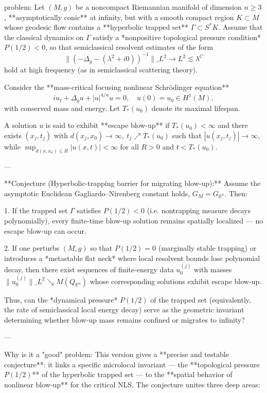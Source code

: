 problem:  
Let \((M,g)\) be a noncompact Riemannian manifold of dimension \(n\ge3\), **asymptotically conic** at infinity, but with a smooth compact region \(K\subset M\) whose geodesic flow contains a **hyperbolic trapped set** \(\Gamma\subset S^*K\).  
Assume that the classical dynamics on \(\Gamma\) satisfy a *nonpositive topological pressure condition* \(P(1/2)<0\), so that semiclassical resolvent estimates of the form
\[
\|(-\Delta_g - (\lambda^2+i0))^{-1}\|\_{L^2\to L^2}\lesssim \lambda^C
\]
hold at high frequency (as in semiclassical scattering theory).

Consider the **mass-critical focusing nonlinear Schrödinger equation**
\[
i u_t+\Delta_g u+|u|^{4/n}u=0,\quad u(0)=u_0\in H^1(M),
\]
with conserved mass and energy. Let \(T_*(u_0)\) denote its maximal lifespan.

A solution \(u\) is said to exhibit **escape blow-up** if \(T_*(u_0)<\infty\) and there exists \((x_j,t_j)\) with \(d(x_j,x_0)\to\infty,\ t_j\nearrow T_*(u_0)\) such that \(|u(x_j,t_j)|\to\infty\), while \(\sup_{d(x,x_0)\le R}|u(x,t)|<\infty\) for all \(R>0\) and \(t<T_*(u_0)\).

---

**Conjecture (Hyperbolic-trapping barrier for migrating blow-up):**  
Assume the asymptotic Euclidean Gagliardo–Nirenberg constant holds, \(G_M=G_{\mathbb{R}^n}\).  
Then:

1. If the trapped set \(\Gamma\) satisfies \(P(1/2)<0\) (i.e. nontrapping measure decays polynomially), every finite-time blow-up solution remains spatially localized — no escape blow-up can occur.

2. If one perturbs \((M,g)\) so that \(P(1/2)=0\) (marginally stable trapping) or introduces a *metastable flat neck* where local resolvent bounds lose polynomial decay, then there exist sequences of finite-energy data \(u_0^{(j)}\) with masses \(\|u_0^{(j)}\|\_{L^2}\searrow M(Q_{\mathbb{R}^n})\) whose corresponding solutions exhibit escape blow-up.

Thus, can the *dynamical pressure* \(P(1/2)\) of the trapped set (equivalently, the rate of semiclassical local energy decay) serve as the geometric invariant determining whether blow-up mass remains confined or migrates to infinity?

---

Why is it a "good" problem:  
This version gives a **precise and testable conjecture**: it links a specific microlocal invariant — the **topological pressure \(P(1/2)\)** of the hyperbolic trapped set — to the **spatial behavior of nonlinear blow-up** for the critical NLS. The conjecture unites three deep areas:


